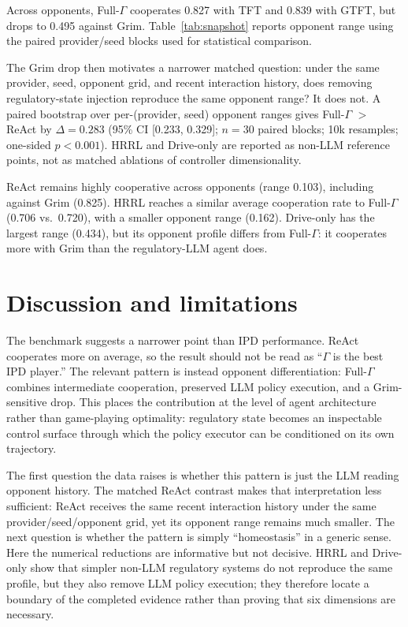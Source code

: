 \documentclass{article}
\begin{document}
Across opponents, Full-$\Gamma$ cooperates 0.827 with TFT and 0.839 with GTFT, but drops to 0.495 against Grim. Table~\ref{tab:snapshot} reports opponent range using the paired provider/seed blocks used for statistical comparison.

The Grim drop then motivates a narrower matched question: under the same provider, seed, opponent grid, and recent interaction history, does removing regulatory-state injection reproduce the same opponent range? It does not. A paired bootstrap over per-(provider, seed) opponent ranges gives Full-$\Gamma$ $>$ ReAct by $\Delta=0.283$ (95\% CI [0.233, 0.329]; $n=30$ paired blocks; 10k resamples; one-sided $p<0.001$). HRRL and Drive-only are reported as non-LLM reference points, not as matched ablations of controller dimensionality.

ReAct remains highly cooperative across opponents (range 0.103), including against Grim (0.825). HRRL reaches a similar average cooperation rate to Full-$\Gamma$ (0.706 vs.\ 0.720), with a smaller opponent range (0.162). Drive-only has the largest range (0.434), but its opponent profile differs from Full-$\Gamma$: it cooperates more with Grim than the regulatory-LLM agent does.

\section{Discussion and limitations}\label{sec:limits}

The benchmark suggests a narrower point than IPD performance. ReAct cooperates more on average, so the result should not be read as ``$\Gamma$ is the best IPD player.'' The relevant pattern is instead opponent differentiation: Full-$\Gamma$ combines intermediate cooperation, preserved LLM policy execution, and a Grim-sensitive drop. This places the contribution at the level of agent architecture rather than game-playing optimality: regulatory state becomes an inspectable control surface through which the policy executor can be conditioned on its own trajectory.

The first question the data raises is whether this pattern is just the LLM reading opponent history. The matched ReAct contrast makes that interpretation less sufficient: ReAct receives the same recent interaction history under the same provider/seed/opponent grid, yet its opponent range remains much smaller. The next question is whether the pattern is simply ``homeostasis'' in a generic sense. Here the numerical reductions are informative but not decisive. HRRL and Drive-only show that simpler non-LLM regulatory systems do not reproduce the same profile, but they also remove LLM policy execution; they therefore locate a boundary of the completed evidence rather than proving that six dimensions are necessary.
\end{document}
